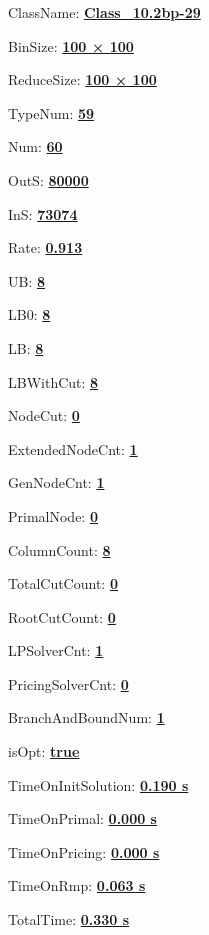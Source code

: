 \documentclass[11pt]{article}
\begin{document}
\pagestyle{empty}


ClassName: \underline{\textbf{Class_10.2bp-29}}
\par
BinSize: \underline{\textbf{100 × 100}}
\par
ReduceSize: \underline{\textbf{100 × 100}}
\par
TypeNum: \underline{\textbf{59}}
\par
Num: \underline{\textbf{60}}
\par
OutS: \underline{\textbf{80000}}
\par
InS: \underline{\textbf{73074}}
\par
Rate: \underline{\textbf{0.913}}
\par
UB: \underline{\textbf{8}}
\par
LB0: \underline{\textbf{8}}
\par
LB: \underline{\textbf{8}}
\par
LBWithCut: \underline{\textbf{8}}
\par
NodeCut: \underline{\textbf{0}}
\par
ExtendedNodeCnt: \underline{\textbf{1}}
\par
GenNodeCnt: \underline{\textbf{1}}
\par
PrimalNode: \underline{\textbf{0}}
\par
ColumnCount: \underline{\textbf{8}}
\par
TotalCutCount: \underline{\textbf{0}}
\par
RootCutCount: \underline{\textbf{0}}
\par
LPSolverCnt: \underline{\textbf{1}}
\par
PricingSolverCnt: \underline{\textbf{0}}
\par
BranchAndBoundNum: \underline{\textbf{1}}
\par
isOpt: \underline{\textbf{true}}
\par
TimeOnInitSolution: \underline{\textbf{0.190 s}}
\par
TimeOnPrimal: \underline{\textbf{0.000 s}}
\par
TimeOnPricing: \underline{\textbf{0.000 s}}
\par
TimeOnRmp: \underline{\textbf{0.063 s}}
\par
TotalTime: \underline{\textbf{0.330 s}}
\par
\newpage


\end{document}
